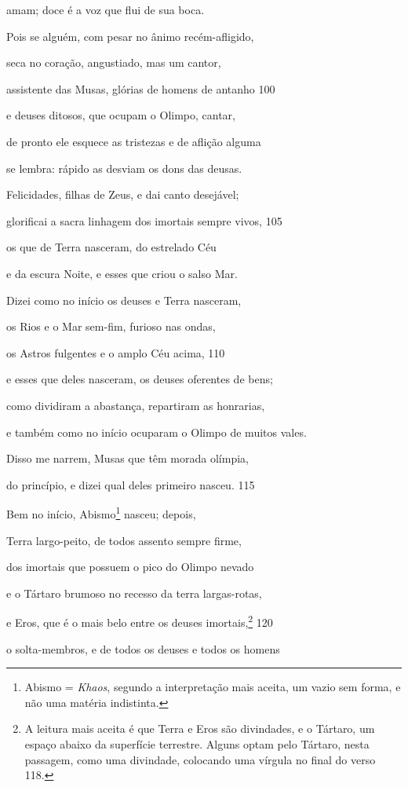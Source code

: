 amam; doce é a voz que flui de sua boca.

Pois se alguém, com pesar no ânimo recém-afligido,

seca no coração, angustiado, mas um cantor,

assistente das Musas, glórias de homens de antanho \num{100}

e deuses ditosos, que ocupam o Olimpo, cantar,

de pronto ele esquece as tristezas e de aflição alguma

se lembra: rápido as desviam os dons das deusas.

\quad{}Felicidades, filhas de Zeus, e dai canto desejável;

glorificai a sacra linhagem dos imortais sempre vivos, \num{105}

os que de Terra nasceram, do estrelado Céu

e da escura Noite, e esses que criou o salso Mar.

Dizei como no início os deuses e Terra nasceram,

os Rios e o Mar sem-fim, furioso nas ondas,

os Astros fulgentes e o amplo Céu acima, \num{110}

e esses que deles nasceram, os deuses oferentes de bens;

como dividiram a abastança, repartiram as honrarias,

e também como no início ocuparam o Olimpo de muitos vales.

Disso me narrem, Musas que têm morada olímpia,

do princípio, e dizei qual deles primeiro nasceu. \num{115}

\quad{}Bem no início, Abismo\footnote{Abismo = \emph{Khaos}, segundo a interpretação mais aceita, um
vazio sem forma, e não uma matéria indistinta.} nasceu; depois,

Terra largo-peito, de todos assento sempre firme,

dos imortais que possuem o pico do Olimpo nevado

e o Tártaro brumoso no recesso da terra largas-rotas,

e Eros, que é o mais belo entre os deuses imortais,\footnote{A leitura mais aceita é que Terra e Eros são divindades, e o
Tártaro, um espaço abaixo da superfície terrestre. Alguns optam pelo
Tártaro, nesta passagem, como uma divindade, colocando uma vírgula no
final do verso 118.} \num{120}

o solta-membros, e de todos os deuses e todos os homens

